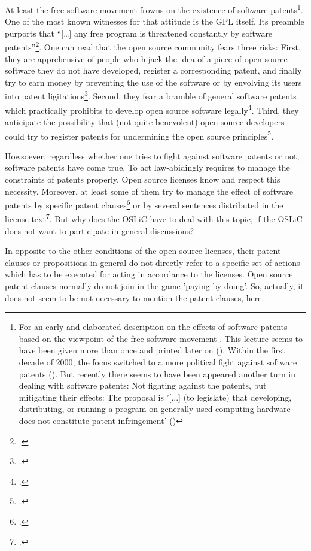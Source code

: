 At least the free software movement frowns on the existence of software
patents\footnote{For an early and elaborated description on the effects of
software patents based on the viewpoint of the free software movement
\cite[see][\nopage wp]{Stallman2001a}. This lecture seems to have been given
more than once and printed later on (\cite[cf.][\nopage wp]{Stallman2002a}).
Within the first decade of 2000, the focus switched to a more political fight
against software patents (\cite[cf.][\nopage wp]{Stallman2004a}). But recently
there seems to have been appeared another turn in dealing with software patents:
Not fighting against the patents, but mitigating their effects: The proposal is
'[...] (to legislate) that developing, distributing, or running a program on
generally used computing hardware does not constitute patent infringement'
(\cite[cf.][\nopage wp]{Stallman2012a})}. One of the most known witnesses for
that attitude is the GPL itself. Its preamble purports that \enquote{[\ldots]
any free program is threatened constantly by software
patents}\footcite[cf.][wp]{Gpl20OsiLicense1991a}. One can read that the open
source community fears three risks: First, they are apprehensive of people who
hijack the idea of a piece of open source software they do not have developed,
register a corresponding patent, and finally try to earn money by preventing the
use of the software or by envolving its users into patent
ligitations\footcite[cf.][234]{JaeMet2011a}. Second, they fear a bramble of
general software patents which practically prohibits to develop open source
software legally\footcite[cf.][234]{JaeMet2011a}. Third, they anticipate the
possibility that (not quite benevolent) open source developers could try to
register patents for undermining the open source
principles\footcite[cf.][235]{JaeMet2011a}.

Howsoever, regardless whether one tries to fight against software patents or not,
software patents have come true. To act law-abidingly requires to manage the
constraints of patents properly. Open source licenses know and respect this
necessity. Moreover, at least some of them try to manage the effect of software
patents by specific patent clauses\footcite[pars pro toto cf.][\nopage wp
§3]{Apl20OsiLicense2004a} or by several sentences distributed in the license
text\footcite[pars pro toto cf.][\nopage wp]{Epl10OsiLicense2005a}. But why
does the OSLiC have to deal with this topic, if the OSLiC does not want to
participate in general discussions?

In opposite to the other conditions of the open source licenses, their patent
clauses or propositions in general do not directly refer to a specific set of
actions which has to be executed for acting in accordance to the licenses. Open
source patent clauses normally do not join in the game 'paying by doing'. So,
actually, it does not seem to be not necessary to mention the patent clauses,
here.

